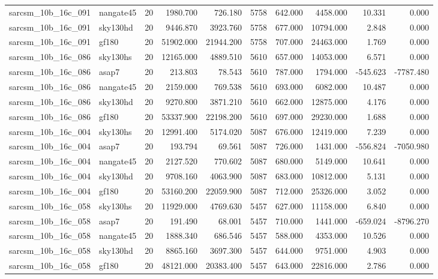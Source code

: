 \begin{longtable}{llrrrrrrrr}
sarcsm\_10b\_16c\_091 & nangate45 & 20 & 1980.700 & 726.180 & 5758 & 642.000 & 4458.000 & 10.331 & 0.000 \\
sarcsm\_10b\_16c\_091 & sky130hd & 20 & 9446.870 & 3923.760 & 5758 & 677.000 & 10794.000 & 2.848 & 0.000 \\
sarcsm\_10b\_16c\_091 & gf180 & 20 & 51902.000 & 21944.200 & 5758 & 707.000 & 24463.000 & 1.769 & 0.000 \\
sarcsm\_10b\_16c\_086 & sky130hs & 20 & 12165.000 & 4889.510 & 5610 & 657.000 & 14053.000 & 6.571 & 0.000 \\
sarcsm\_10b\_16c\_086 & asap7 & 20 & 213.803 & 78.543 & 5610 & 787.000 & 1794.000 & -545.623 & -7787.480 \\
sarcsm\_10b\_16c\_086 & nangate45 & 20 & 2159.000 & 769.538 & 5610 & 693.000 & 6082.000 & 10.487 & 0.000 \\
sarcsm\_10b\_16c\_086 & sky130hd & 20 & 9270.800 & 3871.210 & 5610 & 662.000 & 12875.000 & 4.176 & 0.000 \\
sarcsm\_10b\_16c\_086 & gf180 & 20 & 53337.900 & 22198.200 & 5610 & 697.000 & 29230.000 & 1.688 & 0.000 \\
sarcsm\_10b\_16c\_004 & sky130hs & 20 & 12991.400 & 5174.020 & 5087 & 676.000 & 12419.000 & 7.239 & 0.000 \\
sarcsm\_10b\_16c\_004 & asap7 & 20 & 193.794 & 69.561 & 5087 & 726.000 & 1431.000 & -556.824 & -7050.980 \\
sarcsm\_10b\_16c\_004 & nangate45 & 20 & 2127.520 & 770.602 & 5087 & 680.000 & 5149.000 & 10.641 & 0.000 \\
sarcsm\_10b\_16c\_004 & sky130hd & 20 & 9708.160 & 4063.900 & 5087 & 683.000 & 10812.000 & 5.131 & 0.000 \\
sarcsm\_10b\_16c\_004 & gf180 & 20 & 53160.200 & 22059.900 & 5087 & 712.000 & 25326.000 & 3.052 & 0.000 \\
sarcsm\_10b\_16c\_058 & sky130hs & 20 & 11929.000 & 4769.630 & 5457 & 627.000 & 11158.000 & 6.840 & 0.000 \\
sarcsm\_10b\_16c\_058 & asap7 & 20 & 191.490 & 68.001 & 5457 & 710.000 & 1441.000 & -659.024 & -8796.270 \\
sarcsm\_10b\_16c\_058 & nangate45 & 20 & 1888.340 & 686.546 & 5457 & 588.000 & 4353.000 & 10.526 & 0.000 \\
sarcsm\_10b\_16c\_058 & sky130hd & 20 & 8865.160 & 3697.300 & 5457 & 644.000 & 9751.000 & 4.903 & 0.000 \\
sarcsm\_10b\_16c\_058 & gf180 & 20 & 48121.000 & 20383.400 & 5457 & 643.000 & 22816.000 & 2.786 & 0.000 \\

\end{longtable}
